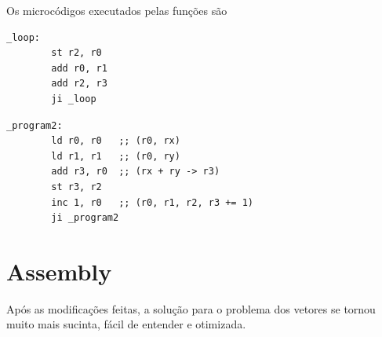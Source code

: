 \documentclass{article}  %
\begin{document}
    Os microcódigos executados pelas funções são

    \renewcommand{\lstlistingname}{Microcódigo}
    \begin{lstlisting}[caption={Load Vector}]
      _loop:
        st r2, r0
        add r0, r1
        add r2, r3
        ji _loop
    \end{lstlisting}
      
    \renewcommand{\lstlistingname}{Microcódigo}
    \begin{lstlisting}[caption={Add Vector}]
      _program2:
        ld r0, r0   ;; (r0, rx)
        ld r1, r1   ;; (r0, ry)
        add r3, r0  ;; (rx + ry -> r3)
        st r3, r2
        inc 1, r0   ;; (r0, r1, r2, r3 += 1)
        ji _program2
    \end{lstlisting}

    \clearpage
    \section{Assembly}

    Após as modificações feitas, a solução para o problema dos vetores se tornou muito mais sucinta, fácil de entender e otimizada.
\end{document}
